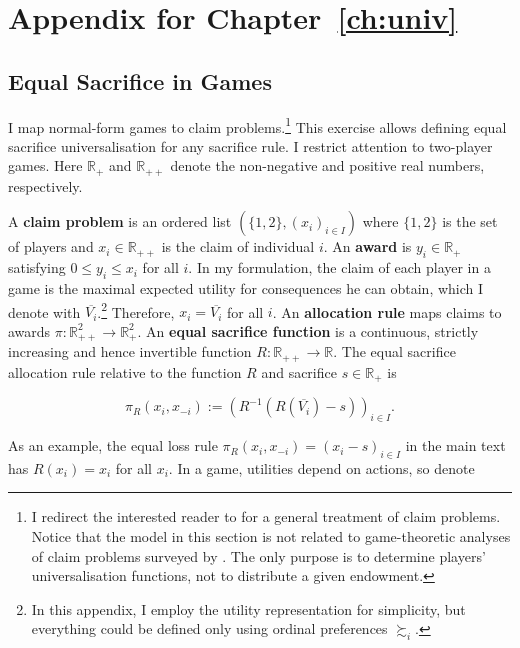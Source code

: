 \chapter{Appendix for Chapter \ref{ch:univ}}
\label{app:univ}

\section{Equal Sacrifice in Games}\label{sec:es}

I map normal-form games to claim problems.\footnote{I redirect the interested reader to \cite{thomsonHowDivideWhen2019} for a general treatment of claim problems. Notice that the model in this section is not related to game-theoretic analyses of claim problems surveyed by \cite{thomsonGametheoreticAnalysisBankruptcy2013}. The only purpose is to determine players' universalisation functions, not to distribute a given endowment.} This exercise allows defining equal sacrifice universalisation for any sacrifice rule. I restrict attention to two-player games. Here \( \mathbb{R}_{+} \) and \( \mathbb{R}_{++} \) denote the non-negative and positive real numbers, respectively.

A \textbf{claim problem} is an ordered list \( \left( \{1, 2 \} , ( x_i )_{i \in I} \right) \) where \( \{1, 2 \} \) is the set of players and \( x_i \in \mathbb{R}_{++} \) is the claim of individual \( i \). An \textbf{award} is \( y_i \in \mathbb{R}_{+}\) satisfying \( 0 \leq y_i \leq x_i \) for all \( i \). In my formulation, the claim of each player in a game is the maximal expected utility for consequences he can obtain, which I denote with \( \overline{V_i} \).\footnote{In this appendix, I employ the utility representation for simplicity, but everything could be defined only using ordinal preferences \( \succsim_i \).} Therefore, \( x_i = \overline{V_i} \) for all \( i \). An \textbf{allocation rule} maps claims to awards \( \pi : \mathbb{R}_{++}^2 \rightarrow \mathbb{R}_{+}^2 \). An \textbf{equal sacrifice function} is a continuous, strictly increasing and hence invertible function \( R: \mathbb{R}_{++} \rightarrow \mathbb{R}\). The equal sacrifice allocation rule relative to the function \( R \) and sacrifice \( s \in \mathbb{R_{+}} \) is

\[
	\pi_{R} \left( x_i, x_{-i} \right) := \left( R^{-1} \left( R \left( \overline{V_i} \right) - s \right) \right)_{i \in I} .
\]

As an example, the equal loss rule \( \pi_R \left( x_i, x_{-i} \right) = \left( x_i - s \right)_{i \in I} \) in the main text has \( R\left(x_i \right) = x_i \) for all \( x_i \). In a game, utilities depend on actions, so denote

